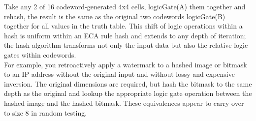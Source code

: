 \documentclass[11pt]{article}
\begin{document}
Take any 2 of 16 codeword-generated 4x4 cells, logicGate(A) them together and rehash, the result is the same as the original two codewords logicGate(B) together for all values in the truth table. This shift of logic operations within a hash is uniform within an ECA rule hash and extends to any depth of iteration; the hash algorithm transforms not only the input data but also the relative logic gates within codewords. \\

For example, you retroactively apply a watermark to a hashed image or bitmask to an IP address without the original input and without lossy and expensive inversion. The original dimensions are required, but hash the bitmask to the same depth as the original and lookup the appropriate logic gate operation between the hashed image and the hashed bitmask. These equivalences appear to carry over to size 8 in random testing.\\
\newpage
\end{document}
